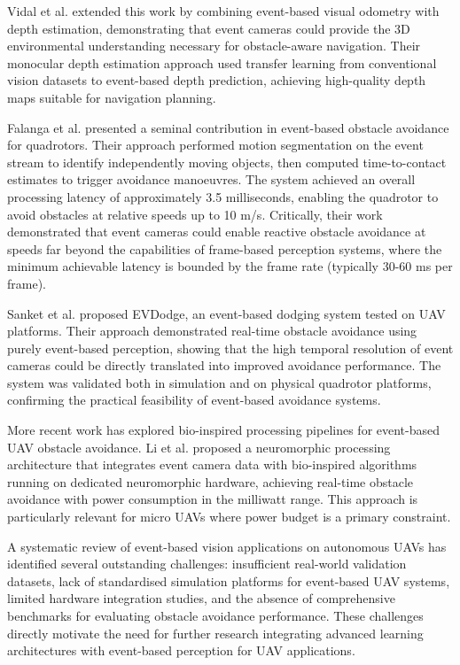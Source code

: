 \documentclass[11pt, a4paper]{report}
\begin{document}
Vidal et al. \cite{vidal2018ultimate} extended this work by combining event-based visual odometry with depth estimation, demonstrating that event cameras could provide the 3D environmental understanding necessary for obstacle-aware navigation. Their monocular depth estimation approach used transfer learning from conventional vision datasets to event-based depth prediction, achieving high-quality depth maps suitable for navigation planning. 

Falanga et al. \cite{falanga2019fast} presented a seminal contribution in event-based obstacle avoidance for quadrotors. Their approach performed motion segmentation on the event stream to identify independently moving objects, then computed time-to-contact estimates to trigger avoidance manoeuvres. The system achieved an overall processing latency of approximately 3.5 milliseconds, enabling the quadrotor to avoid obstacles at relative speeds up to 10 m/s. Critically, their work demonstrated that event cameras could enable reactive obstacle avoidance at speeds far beyond the capabilities of frame-based perception systems, where the minimum achievable latency is bounded by the frame rate (typically 30-60 ms per frame). 

Sanket et al. \cite{sanket2020evdodgenet} proposed EVDodge, an event-based dodging system tested on UAV platforms. Their approach demonstrated real-time obstacle avoidance using purely event-based perception, showing that the high temporal resolution of event cameras could be directly translated into improved avoidance performance. The system was validated both in simulation and on physical quadrotor platforms, confirming the practical feasibility of event-based avoidance systems. 

More recent work has explored bio-inspired processing pipelines for event-based UAV obstacle avoidance. Li et al. \cite{li2024taming} proposed a neuromorphic processing architecture that integrates event camera data with bio-inspired algorithms running on dedicated neuromorphic hardware, achieving real-time obstacle avoidance with power consumption in the milliwatt range. This approach is particularly relevant for micro UAVs where power budget is a primary constraint. 

A systematic review of event-based vision applications on autonomous UAVs \cite{santos2026event} has identified several outstanding challenges: insufficient real-world validation datasets, lack of standardised simulation platforms for event-based UAV systems, limited hardware integration studies, and the absence of comprehensive benchmarks for evaluating obstacle avoidance performance. These challenges directly motivate the need for further research integrating advanced learning architectures with event-based perception for UAV applications. 
\end{document}
